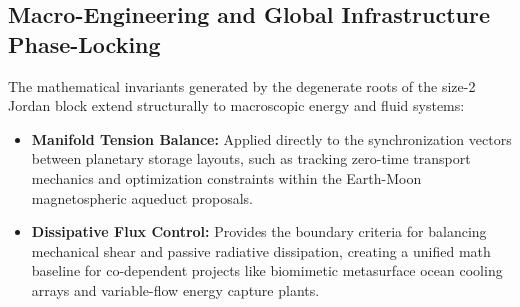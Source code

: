 \documentclass[11pt,preview]{article}
\begin{document}
\subsection{Macro-Engineering and Global Infrastructure Phase-Locking}
The mathematical invariants generated by the degenerate roots of the size-2 Jordan block extend structurally to macroscopic energy and fluid systems:
\begin{itemize}
    \item \textbf{Manifold Tension Balance:} Applied directly to the synchronization vectors between planetary storage layouts, such as tracking zero-time transport mechanics and optimization constraints within the Earth-Moon magnetospheric aqueduct proposals.
    \item \textbf{Dissipative Flux Control:} Provides the boundary criteria for balancing mechanical shear and passive radiative dissipation, creating a unified math baseline for co-dependent projects like biomimetic metasurface ocean cooling arrays and variable-flow energy capture plants.
\end{itemize}
\end{document}
